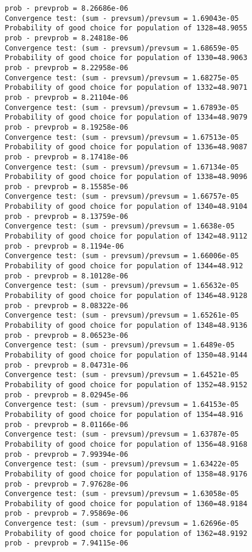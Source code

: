 \documentclass[11pt,onecolumn]{article}
\begin{document}
\begin{verbatim}
prob - prevprob = 8.26686e-06
Convergence test: (sum - prevsum)/prevsum = 1.69043e-05
Probability of good choice for population of 1328=48.9055
prob - prevprob = 8.24818e-06
Convergence test: (sum - prevsum)/prevsum = 1.68659e-05
Probability of good choice for population of 1330=48.9063
prob - prevprob = 8.22958e-06
Convergence test: (sum - prevsum)/prevsum = 1.68275e-05
Probability of good choice for population of 1332=48.9071
prob - prevprob = 8.21104e-06
Convergence test: (sum - prevsum)/prevsum = 1.67893e-05
Probability of good choice for population of 1334=48.9079
prob - prevprob = 8.19258e-06
Convergence test: (sum - prevsum)/prevsum = 1.67513e-05
Probability of good choice for population of 1336=48.9087
prob - prevprob = 8.17418e-06
Convergence test: (sum - prevsum)/prevsum = 1.67134e-05
Probability of good choice for population of 1338=48.9096
prob - prevprob = 8.15585e-06
Convergence test: (sum - prevsum)/prevsum = 1.66757e-05
Probability of good choice for population of 1340=48.9104
prob - prevprob = 8.13759e-06
Convergence test: (sum - prevsum)/prevsum = 1.6638e-05
Probability of good choice for population of 1342=48.9112
prob - prevprob = 8.1194e-06
Convergence test: (sum - prevsum)/prevsum = 1.66006e-05
Probability of good choice for population of 1344=48.912
prob - prevprob = 8.10128e-06
Convergence test: (sum - prevsum)/prevsum = 1.65632e-05
Probability of good choice for population of 1346=48.9128
prob - prevprob = 8.08322e-06
Convergence test: (sum - prevsum)/prevsum = 1.65261e-05
Probability of good choice for population of 1348=48.9136
prob - prevprob = 8.06523e-06
Convergence test: (sum - prevsum)/prevsum = 1.6489e-05
Probability of good choice for population of 1350=48.9144
prob - prevprob = 8.04731e-06
Convergence test: (sum - prevsum)/prevsum = 1.64521e-05
Probability of good choice for population of 1352=48.9152
prob - prevprob = 8.02945e-06
Convergence test: (sum - prevsum)/prevsum = 1.64153e-05
Probability of good choice for population of 1354=48.916
prob - prevprob = 8.01166e-06
Convergence test: (sum - prevsum)/prevsum = 1.63787e-05
Probability of good choice for population of 1356=48.9168
prob - prevprob = 7.99394e-06
Convergence test: (sum - prevsum)/prevsum = 1.63422e-05
Probability of good choice for population of 1358=48.9176
prob - prevprob = 7.97628e-06
Convergence test: (sum - prevsum)/prevsum = 1.63058e-05
Probability of good choice for population of 1360=48.9184
prob - prevprob = 7.95869e-06
Convergence test: (sum - prevsum)/prevsum = 1.62696e-05
Probability of good choice for population of 1362=48.9192
prob - prevprob = 7.94115e-06

\end{verbatim}
\end{document}
